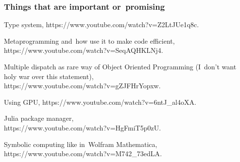 \documentclass[10pt,t]{beamer}
\begin{document}
\begin{frame}
  \frametitle{Things that are important or~promising}


  Type system, 
  {https://www.youtube.com/watch?v=Z2LtJUe1q8c}.

  \vspace{0.3em}



  Metaprogramming and~how use it to make code efficient, \\
  {https://www.youtube.com/watch?v=SeqAQHKLNj4}.

  \vspace{0.3em}



  Multiple dispatch as rare way of Object Oriented Programming
  (I~don't want holy war over this statement), \\
  {https://www.youtube.com/watch?v=gZJFHrYopxw}.

  \vspace{0.3em}



  Using GPU, 
  {https://www.youtube.com/watch?v=6ntJ\_al4oXA}.

  \vspace{0.3em}



  Julia package manager, \\
  {https://www.youtube.com/watch?v=HgFmiT5p0zU}.

  \vspace{0.3em}



  Symbolic computing like in~Wolfram Mathematica, \\
  {https://www.youtube.com/watch?v=M742\_73edLA}.

\end{frame}
\end{document}
